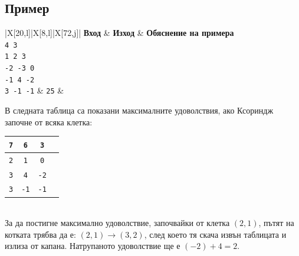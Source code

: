 \documentclass[12pt]{article}
\begin{document}
\subsection{Пример}
\begin{table}[!ht]
	\begin{tblr}{|X[20,l]|X[8,l]|X[72,j]|}
		\hline
		\textbf{Вход} & \textbf{Изход} & \textbf{Обяснение на примера} \\
		\hline
		\texttt{4 3 \\
			1 2 3\\
			-2 -3 0\\
			-1 4 -2\\
			3 -1 -1}
		& 
		\texttt{25}
		& 
		{В следната таблица са показани максималните удоволствия, ако Ксориндж започне от всяка клетка:\\
		\begin{tabular}{|c|c|c|c|}
			\hline
			\texttt{7} & \texttt{6} & \texttt{3}\\
			\hline
			\texttt{2} & \texttt{1} & \texttt{0}\\
			\hline
			\texttt{3} & \texttt{4} & \texttt{-2}\\
			\hline
			\texttt{3} & \texttt{-1} & \texttt{-1}\\
			\hline
		\end{tabular}\\
		
		За да постигне максимално удоволствие, започвайки от клетка $(2,1)$, пътят на котката трябва да е: $(2,1) \to (3,2)$, след което тя скача извън таблицата и излиза от капана. Натрупаното удоволствие ще е $(-2)+4=2$.} \\
		\hline
	\end{tblr}
\end{table}
\FloatBarrier


	
\end{document}
